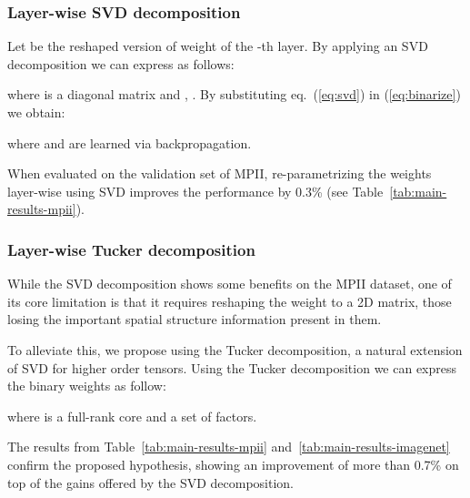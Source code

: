 \documentclass[10pt,twocolumn,letterpaper]{article}
\begin{document}
\subsubsection{Layer-wise SVD decomposition}\label{sssec:layer-wise-svd}
Let  be the reshaped version of weight  of the -th layer. By applying an SVD decomposition we can express  as follows:


where  is a diagonal matrix and , . By substituting eq.~(\ref{eq:svd}) in (\ref{eq:binarize}) we obtain:


where  and  are learned via backpropagation.

When evaluated on the validation set of MPII, re-parametrizing the weights layer-wise using SVD improves the performance by 0.3\% (see Table~\ref{tab:main-results-mpii}).

\subsubsection{Layer-wise Tucker decomposition}\label{sssec:layer-wise-tucker}

While the SVD decomposition shows some benefits on the MPII dataset, one of its core limitation is that it requires reshaping the weight to a 2D matrix, those losing the important spatial structure information present in them.

To alleviate this, we propose using the Tucker decomposition, a natural extension of SVD for higher order tensors. Using the Tucker decomposition we can express the binary weights as follow:


where  is a full-rank core and  a set of factors.

The results from Table~\ref{tab:main-results-mpii} and~\ref{tab:main-results-imagenet} confirm the proposed hypothesis, showing an improvement of more than 0.7\% on top of the gains offered by the SVD decomposition. 
\end{document}
